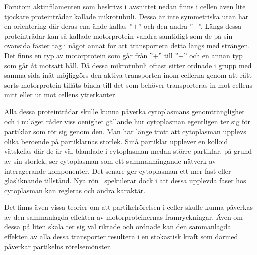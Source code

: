 Förutom aktinfilamenten som beskrivs i avsnittet nedan finns i cellen även lite tjockare proteintrådar kallade mikrotubuli. Dessa är inte symmetriska utan har en orientering där deras ena ände kallas ''$+$'' och den andra ''$-$''. Längs dessa proteintrådar kan så kallade motorprotein vandra samtidigt som de på sin ovansida fäster tag i något annat för att transportera detta längs med strängen. Det finns en typ av motorprotein som går från ''$+$'' till ''$-$'' och en annan typ som går åt motsatt håll. Då dessa mikrotubuli oftast sitter ordnade i grupp med samma sida inåt möjliggörs den aktiva transporten inom cellerna genom att rätt sorts motorprotein tillåts binda till det som behöver transporteras in mot cellens mitt eller ut mot cellens ytterkanter. 


Alla dessa proteintrådar skulle kunna påverka cytoplasmans genomtränglighet och i nuläget råder viss oenighet gällande hur cytoplasman egentligen ter sig för partiklar som rör sig genom den. Man har länge trott att cytoplasman upplevs olika beroende på partiklarnas storlek. Små partiklar upplever en kolloid vätskefas där de är väl blandade i cytoplasman medan större partiklar, på grund av sin storlek, ser cytoplasman som ett sammanhängande nätverk av interagerande komponenter. Det senare ger cytoplasman ett mer fast eller glasliknande tillstånd. Nya rön~\cite{Parry_etal2014} spekulerar dock i att dessa upplevda faser hos cytoplasman kan regleras och ändra karaktär.

Det finns även vissa teorier om att partikelrörelsen i celler skulle kunna påverkas av den sammanlagda effekten av motorproteinernas framryckningar. Även om dessa på liten skala ter sig väl riktade och ordnade kan den sammanlagda effekten av alla dessa transporter resultera i en stokastisk kraft som därmed påverkar partikelns rörelsemönster. 


